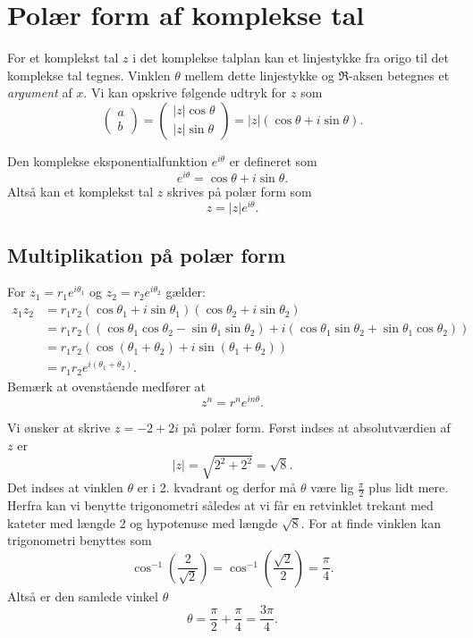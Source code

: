\section{Polær form af komplekse tal}
For et komplekst tal $z$ i det komplekse talplan kan et linjestykke fra origo til det komplekse tal tegnes. Vinklen $\theta$ mellem dette linjestykke og $\Re$-aksen betegnes et \textit{argument} af $x$. Vi kan opskrive følgende udtryk for $z$ som
\[ 
\begin{pmatrix}
  a \\
  b
\end{pmatrix}
=
\begin{pmatrix}
  |z| \cos\theta \\
  |z| \sin\theta
\end{pmatrix}
=
|z|(\cos\theta + i \sin\theta)
.\]

\begin{definition} 
  Den komplekse eksponentialfunktion $e^{i\theta}$ er defineret som
  \[ 
  e^{i\theta} = \cos\theta + i \sin\theta
  .\]
  Altså kan et komplekst tal $z$ skrives på polær form som
  \[ 
  z = |z|e^{i \theta}
  .\]
\end{definition}

\subsection{Multiplikation på polær form}
For $z_1 = r_1 e^{i\theta_1}$ og $z_2 = r_2 e^{i\theta_2}$ gælder:
\begin{align*}
  z_1z_2 &= r_1r_2(\cos\theta_1 + i \sin\theta_1)(\cos\theta_2 + i \sin\theta_2) \\
  &= r_1r_2 \left( \left( \cos\theta_1 \cos\theta_2 - \sin\theta_1 \sin\theta_2 \right) + i \left( \cos\theta_1 \sin\theta_2 + \sin\theta_1 \cos\theta_2 \right) \right) \\
  &= r_1r_2 \left( \cos(\theta_1 + \theta_2) + i \sin(\theta_1 + \theta_2)\right) \\
  &= r_1r_2 e^{i(\theta_1 + \theta_2)}
.\end{align*}
Bemærk at ovenstående medfører at
\[ 
z^{n} = r^{n}e^{i n\theta}
.\]

\begin{eks} 
  Vi ønsker at skrive $z = -2 + 2i$ på polær form.
  \bigbreak
  Først indses at absolutværdien af $z$ er
  \[ 
  |z| = \sqrt{2^2 + 2^2} = \sqrt{8}
  .\]
  Det indses at vinklen $\theta$ er i 2. kvadrant og derfor må $\theta$ være lig $\frac{\pi}{2}$ plus lidt mere. Herfra kan vi benytte trigonometri således at vi får en retvinklet trekant med kateter med længde 2 og hypotenuse med længde $\sqrt{8}$. For at finde vinklen kan trigonometri benyttes som
  \[ 
    \cos^{-1}(\frac{2}{\sqrt{2}}) = \cos^{-1}(\frac{\sqrt{2}}{2}) = \frac{\pi}{4}
  .\]
  Altså er den samlede vinkel $\theta$
  \[ 
  \theta = \frac{\pi}{2} + \frac{\pi}{4} = \frac{3\pi}{4}
  .\]
\end{eks}

